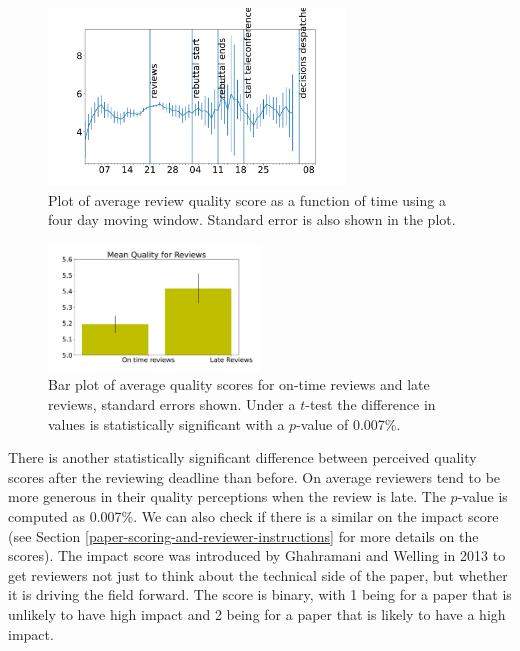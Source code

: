 \begin{figure}[htb]
\centering
\includegraphics[width=0.70\textwidth]{diagrams/neurips/review-quality-time.pdf}

\caption{Plot of average review quality score as a function of time using a four day moving window. Standard error is also shown in the plot.}
\label{review-quality-time}
\end{figure}

\begin{figure}[htb]
\centering
\includegraphics[width=0.50\textwidth]{diagrams/neurips/review-quality-early-late.pdf}

\caption{Bar plot of average quality scores for on-time
reviews and late reviews, standard errors shown. Under a \(t\)-test the
difference in values is statistically significant with a \(p\)-value of
0.007\%.} \label{review-quality-early-late}
\end{figure}

There is another statistically significant difference between perceived
quality scores after the reviewing deadline than before. On average
reviewers tend to be more generous in their quality perceptions when the
review is late. The \(p\)-value is computed as 0.007\%. We can also
check if there is a similar on the impact score (see Section \ref{paper-scoring-and-reviewer-instructions} for more details on the scores). The impact score was
introduced by Ghahramani and Welling in 2013 to get reviewers not just to think
about the technical side of the paper, but whether it is driving the
field forward. The score is binary, with 1 being for a paper that is
unlikely to have high impact and 2 being for a paper that is likely to
have a high impact.

